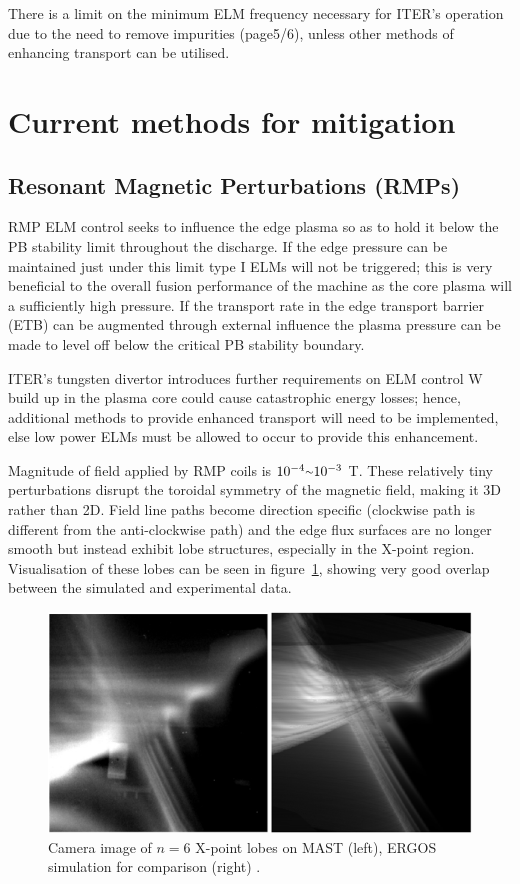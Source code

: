 \documentclass[12pt]{article}  %
\providecommand{\squiggle}{\raise.17ex\hbox{$\scriptstyle\sim$}} %
\begin{document}
There is a limit on the minimum ELM frequency necessary for ITER's operation due to the need to remove impurities (page5/6)\cite{Loarte2014a}, unless other methods of enhancing transport can be utilised.

\section{Current methods for mitigation}\label{sec:Mitigation}

\subsection{Resonant Magnetic Perturbations (RMPs)}\label{ssec:RMP}
RMP ELM control seeks to influence the edge plasma so as to hold it below the PB stability limit throughout the discharge. If the edge pressure can be maintained just under this limit type I ELMs will not be triggered; this is very beneficial to the overall fusion performance of the machine as the core plasma will a sufficiently high pressure. If the transport rate in the edge transport barrier (ETB) can be augmented through external influence the plasma pressure can be made to level off below the critical PB stability boundary.

ITER's tungsten divertor introduces further requirements on ELM control\cite{KirkFF} W build up in the plasma core could cause catastrophic energy losses; hence, additional methods to provide enhanced transport will need to be implemented, else low power ELMs must be allowed to occur to provide this enhancement.

Magnitude of field applied by RMP coils is $10^{-4} \squiggle 10^{-3}$ T\cite{Evans2015}. These relatively tiny perturbations disrupt the toroidal symmetry of the magnetic field, making it 3D rather than 2D. Field line paths become direction specific (clockwise path is different from the anti-clockwise path) and the edge flux surfaces are no longer smooth but instead exhibit lobe structures, especially in the X-point region. Visualisation of these lobes can be seen in figure~\ref{fig:lobes}, showing very good overlap between the simulated and experimental data.

\begin{figure}
\includegraphics[scale=0.5]{Figures/lobes.png}
\centering
\caption{Camera image of $n=6$ X-point lobes on MAST (left), ERGOS simulation for comparison (right) \cite{Harrison2014}.}\label{fig:lobes}
\end{figure}
\end{document}
